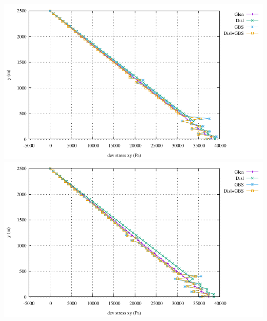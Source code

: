 \begin{center}
\includegraphics[width=7.cm]{python_codes/fieldstone_59/results/sigmaxy_core1}
\includegraphics[width=7.cm]{python_codes/fieldstone_59/results/sigmaxy_core2}
\end{center}


